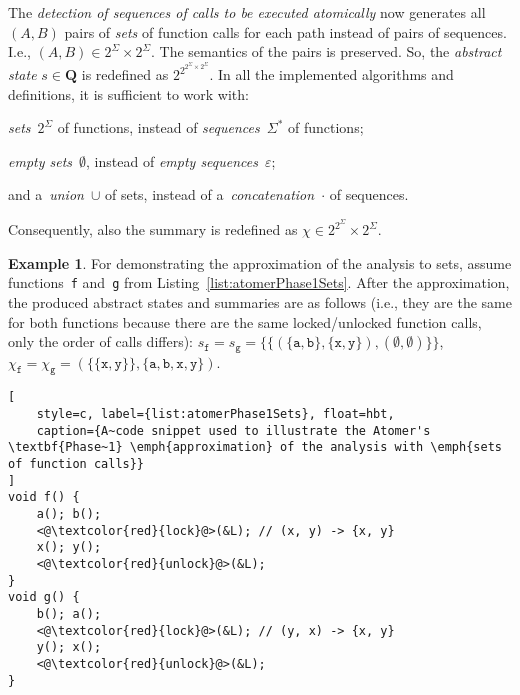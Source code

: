 \documentclass{ExcelAtFIT}
\theoremstyle{definition}
\newtheorem{example}{Example}[section]
\begin{document}
The \emph{detection of sequences of calls to be executed atomically} now generates all ${ (A, B) }$ pairs of \emph{sets} of function calls for each path instead of pairs of sequences. I.e., $ {(A, B)} \in 2^\Sigma \times 2^\Sigma $. The semantics of the pairs is preserved. So, the \emph{abstract state} $ s \in \boldsymbol{Q} $ is redefined as $ 2^{2^{2^\Sigma \times 2^\Sigma}} $. In all the implemented algorithms and definitions, it is sufficient to work with:
\begin{enumerate*}[label={(\roman*)}]
    \item \emph{sets}~$ 2^\Sigma $ of functions, instead of \emph{sequences}~$ \Sigma^* $ of functions;

    \item \emph{empty sets}~$ \emptyset $, instead of \emph{empty sequences}~$ \varepsilon $;
    
    \item and a~\emph{union}~$ \cup $ of sets, instead of a~\emph{concatenation}~$ \cdot $ of sequences.
\end{enumerate*}
Consequently, also the summary is redefined as $ \chi \in 2^{2^\Sigma} \times 2^\Sigma $.

\begin{example}
    For demonstrating the approximation of the analysis to sets, assume functions~\texttt{f} and~\texttt{g} from Listing~\ref{list:atomerPhase1Sets}. After the approximation, the produced abstract states and summaries are as follows (i.e., they are the same for both functions because there are the same locked/unlocked function calls, only the order of calls differs): $ s_\mathtt{f} = s_\mathtt{g} = \{\{({\{\mathtt{a}, \mathtt{b}\}}, {\{\mathtt{x}, \mathtt{y}\}}), {(\emptyset, \emptyset)}\}\} $, $ \chi_\mathtt{f} = \chi_\mathtt{g} = ({\{\{\mathtt{x}, \mathtt{y}\}\}}, {\{\mathtt{a}, \mathtt{b}, \mathtt{x}, \mathtt{y}\}}) $.
\end{example}

\begin{lstlisting}[
    style=c, label={list:atomerPhase1Sets}, float=hbt,
    caption={A~code snippet used to illustrate the Atomer's \textbf{Phase~1} \emph{approximation} of the analysis with \emph{sets of function calls}}
]
void f() {
    a(); b();
    <@\textcolor{red}{lock}@>(&L); // (x, y) -> {x, y}
    x(); y();
    <@\textcolor{red}{unlock}@>(&L);
}
void g() {
    b(); a();
    <@\textcolor{red}{lock}@>(&L); // (y, x) -> {x, y}
    y(); x();
    <@\textcolor{red}{unlock}@>(&L);
}
\end{lstlisting}
\end{document}
